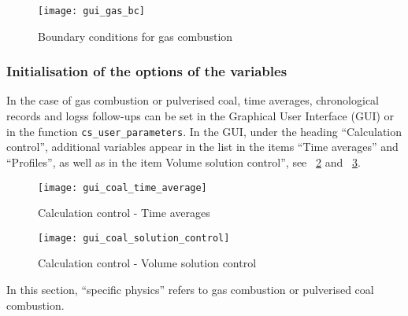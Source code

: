 \newpage

\begin{figure}[!ht]
\begin{center}
\texttt{[image: gui\_gas\_bc]}
\caption{Boundary conditions for gas combustion}
\label{fig:cond_lim-gas}
\end{center}
\end{figure}


\subsubsection{Initialisation of the options of the variables}
In the case of gas combustion or pulverised coal, time averages, chronological records and logss follow-ups can be set in the Graphical User Interface (GUI) or in the function \texttt{cs\_user\_parameters}. In the GUI, under the heading ``Calculation control'', additional variables appear in the list in the items ``Time averages'' and ``Profiles'', as well as in the item Volume solution control'', see \figurename~\ref{fig:t_average-coal} and \figurename~\ref{fig:V_control-coal}.

\begin{figure}[!ht]
\begin{center}
\texttt{[image: gui\_coal\_time\_average]}
\caption{Calculation control - Time averages}
\label{fig:t_average-coal}
\end{center}
\end{figure}

\begin{figure}[!ht]
\begin{center}
\texttt{[image: gui\_coal\_solution\_control]}
\caption{Calculation control - Volume solution control}
\label{fig:V_control-coal}
\end{center}
\end{figure}

In this section, ``specific physics'' refers to gas combustion or
pulverised coal combustion.


